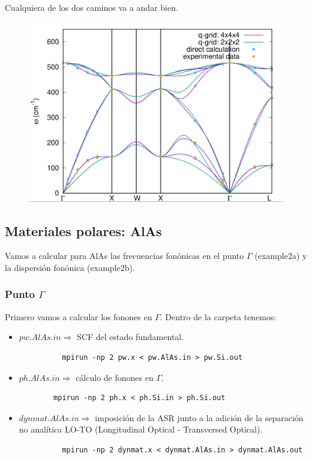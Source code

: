   Cualquiera de los dos caminos va a andar bien.
  \begin{figure}[H]
    \centering
    \includegraphics[scale = 0.35]{figs/D5/Si_disp.png}
  \end{figure}

\subsection{Materiales polares: AlAs}

  Vamos a calcular para AlAs las frecuencias fonónicas en el punto $\Gamma$ (example2a) y la dispersión fonónica (example2b).

\subsubsection{Punto $\Gamma$}

  Primero vamos a calcular los fonones en $\Gamma$. Dentro de la carpeta tenemos:
    \begin{itemize}
      \item $pw.AlAs.in \Rightarrow$ SCF del estado fundamental.
        \begin{verbatim}
          mpirun -np 2 pw.x < pw.AlAs.in > pw.Si.out
        \end{verbatim}
      \item $ph.AlAs.in \Rightarrow$ cálculo de fonones en $\Gamma$.
      \begin{verbatim}
        mpirun -np 2 ph.x < ph.Si.in > ph.Si.out
      \end{verbatim}
      \item $dynmat.AlAs.in \Rightarrow$ imposición de la ASR junto a la adición de la separación no analítica LO-TO (Longitudinal Optical - Transversed Optical).
      \begin{verbatim}
          mpirun -np 2 dynmat.x < dynmat.AlAs.in > dynmat.AlAs.out
      \end{verbatim}
    \end{itemize}

